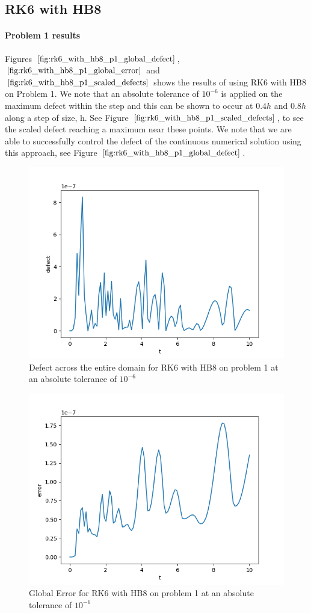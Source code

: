 \subsection{RK6 with HB8}
\paragraph{Problem 1 results}
Figures $\ref{fig:rk6_with_hb8_p1_global_defect}$, $\ref{fig:rk6_with_hb8_p1_global_error}$ and $\ref{fig:rk6_with_hb8_p1_scaled_defects}$ shows the results of using RK6 with HB8 on Problem 1. We note that an absolute tolerance of $10^{-6}$ is applied on the maximum defect within the step and this can be shown to occur at $0.4h$ and $0.8h$ along a step of size, h. See Figure $\ref{fig:rk6_with_hb8_p1_scaled_defects}$, to see the scaled defect reaching a maximum near these points. We note that we are able to successfully control the defect of the continuous numerical solution using this approach, see Figure $\ref{fig:rk6_with_hb8_p1_global_defect}$. 


\begin{figure}[H]
\centering
\includegraphics[width=0.7\linewidth]{./figures/rk6_with_hb8_p1_global_defect}
\caption{Defect across the entire domain for RK6 with HB8 on problem 1 at an absolute tolerance of $10^{-6}$}
\label{fig:rk6_with_hb8_p1_global_defect}
\end{figure}

\begin{figure}[H]
\centering
\includegraphics[width=0.7\linewidth]{./figures/rk6_with_hb8_p1_global_error}
\caption{Global Error for RK6 with HB8 on problem 1 at an absolute tolerance of $10^{-6}$}
\label{fig:rk6_with_hb8_p1_global_error}
\end{figure}

